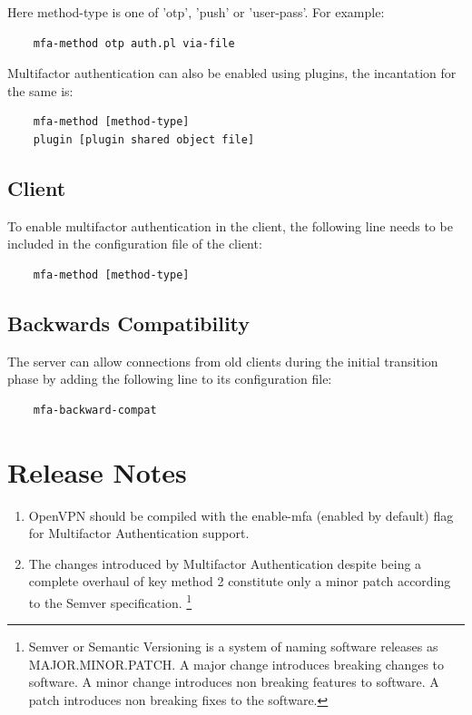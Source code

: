 \documentclass[11pt,oneside]{book}
\begin{document}
\noindent Here method-type is one of 'otp', 'push' or 'user-pass'. For example:
\begin{verbatim}
    mfa-method otp auth.pl via-file
\end{verbatim}

\noindent Multifactor authentication can also be enabled using plugins, the incantation for the same is:
\begin{verbatim}
    mfa-method [method-type]
    plugin [plugin shared object file]
\end{verbatim}

\subsection{Client}
To enable multifactor authentication in the client, the following line needs to be included in the
configuration file of the client:

\begin{verbatim}
    mfa-method [method-type]
\end{verbatim}

\subsection{Backwards Compatibility}
\label{MFA:BackwardCompat}
The server can allow connections from old clients during the initial transition phase by adding
the following line to its configuration file:

\begin{verbatim}
    mfa-backward-compat
\end{verbatim}


\section{Release Notes}
\begin{enumerate}
    \item OpenVPN should be compiled with the enable-mfa (enabled by default) flag for Multifactor
        Authentication support.
    \item The changes introduced by Multifactor Authentication despite being a complete overhaul of key method
          2 constitute only a minor patch according to the Semver specification. \footnote{Semver or Semantic
          Versioning is a system of naming software releases as MAJOR.MINOR.PATCH. A major change introduces
          breaking changes to software. A minor change introduces non breaking features to software.
          A patch introduces non breaking fixes to the software.}
\end{enumerate}
\end{document}
